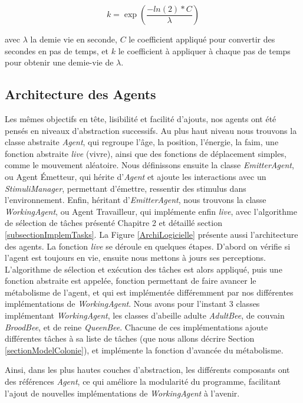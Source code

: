 			\begin{equation}
			k = \exp(\frac{-ln(2) * C}{\lambda})
			\end{equation}
			
			avec $\lambda$ la demie vie en seconde, $C$ le coefficient appliqué pour convertir des secondes en pas de temps, et $k$ le coefficient à appliquer à chaque pas de temps pour obtenir une demie-vie de $\lambda$.
			
			\subsection{Architecture des Agents}
			Les mêmes objectifs en tête, lisibilité et facilité d'ajouts, nos agents ont été pensés en niveaux d'abstraction successifs. Au plus haut niveau nous trouvons la classe abstraite \textit{Agent}, qui regroupe l'âge, la position, l'énergie, la faim, une fonction abstraite \textit{live} (vivre), ainsi que des fonctions de déplacement simples, comme le mouvement aléatoire. Nous définissons ensuite la classe \textit{EmitterAgent}, ou Agent Émetteur, qui hérite d'\textit{Agent} et ajoute les interactions avec un \textit{StimuliManager}, permettant d'émettre, ressentir des stimulus dans l'environnement. Enfin, héritant d'\textit{EmitterAgent}, nous trouvons la classe \textit{WorkingAgent}, ou Agent Travailleur, qui implémente enfin \textit{live}, avec l'algorithme de sélection de tâches présenté Chapitre 2 et détaillé section \ref{subsectionImplemTasks}. La Figure \ref{ArchiLogicielle} présente aussi l'architecture des agents. La fonction \textit{live} se déroule en quelques étapes. D'abord on vérifie si l'agent est toujours en vie, ensuite nous mettons à jours ses perceptions. L'algorithme de sélection et exécution des tâches est alors appliqué, puis une fonction abstraite est appelée, fonction permettant de faire avancer le métabolisme de l'agent, et qui est implémentée différemment par nos différentes implémentations de \textit{WorkingAgent}. Nous avons pour l'instant 3 classes implémentant \textit{WorkingAgent}, les classes d'abeille adulte \textit{AdultBee}, de couvain \textit{BroodBee}, et de reine \textit{QueenBee}. Chacune de ces implémentations ajoute différentes tâches à sa liste de tâches (que nous allons décrire Section \ref{sectionModelColonie}), et implémente la fonction d'avancée du métabolisme.
			
			Ainsi, dans les plus hautes couches d'abstraction, les différents composants ont des références \textit{Agent}, ce qui améliore la modularité du programme, facilitant l'ajout de nouvelles implémentations de \textit{WorkingAgent} à l'avenir. 
			
